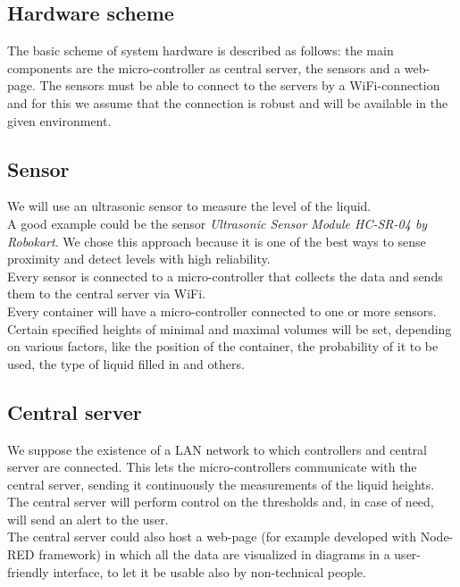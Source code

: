 \documentclass{article}
\begin{document}
\subsection{Hardware scheme}

The basic scheme of system hardware is described as follows: the main components
are the micro-controller as central server, the sensors and a web-page. The
sensors must be able to connect to the servers by a WiFi-connection and for this
we assume that the connection is robust and will be available in the given
environment.  \par

\subsection{Sensor}
We will use an ultrasonic sensor to measure the level of the liquid. \\
A good example could be the sensor \textit{Ultrasonic Sensor Module HC-SR-04 by
  Robokart}. We chose this approach because it is one of the best ways to sense
proximity and detect levels with high reliability. \\ 

Every sensor is connected to a micro-controller that collects the data and sends
them to the central server via WiFi. \\ 

Every container will have a micro-controller connected to one or more sensors.
Certain specified heights of minimal and maximal volumes will be set, depending
on various factors, like the position of the container, the probability of it to
be used, the type of liquid filled in and others.

\subsection{Central server}

We suppose the existence of a LAN network to which controllers and central
server are connected. This lets the micro-controllers communicate with the
central server, sending it continuously the measurements of the liquid
heights. \\

The central server will perform control on the thresholds and, in case of need,
will send an alert to the user. \\ 

The central server could also host a web-page (for example developed with
Node-RED framework) in which all the data are visualized in diagrams in a
user-friendly interface, to let it be usable also by non-technical people. \\
\end{document}
